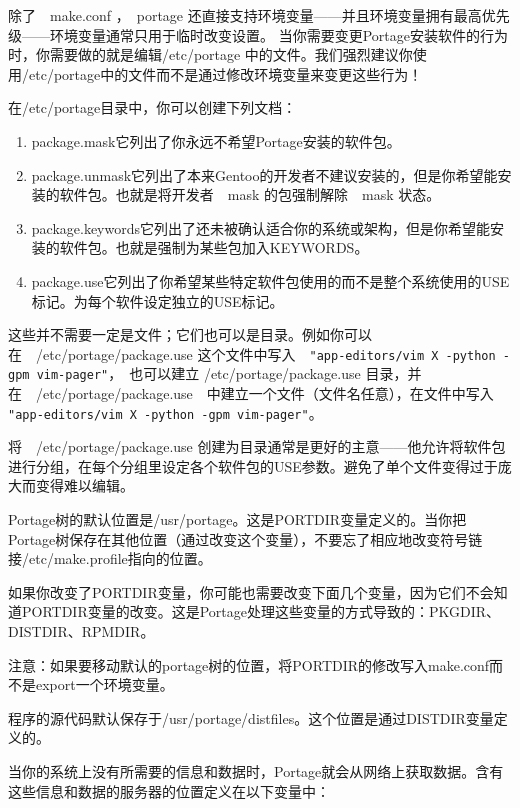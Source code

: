 除了　make.conf ，　portage 还直接支持环境变量——并且环境变量拥有最高优先级——环境变量通常只用于临时改变设置。
当你需要变更Portage安装软件的行为时，你需要做的就是编辑/etc/portage 中的文件。我们强烈建议你使用/etc/portage中的文件而不是通过修改环境变量来变更这些行为！


在/etc/portage目录中，你可以创建下列文档：

\begin{enumerate}
\item package.mask它列出了你永远不希望Portage安装的软件包。
\item package.unmask它列出了本来Gentoo的开发者不建议安装的，但是你希望能安装的软件包。也就是将开发者　mask 的包强制解除　mask 状态。
\item package.keywords它列出了还未被确认适合你的系统或架构，但是你希望能安装的软件包。也就是强制为某些包加入KEYWORDS。
\item package.use它列出了你希望某些特定软件包使用的而不是整个系统使用的USE标记。为每个软件设定独立的USE标记。
\end{enumerate}

这些并不需要一定是文件；它们也可以是目录。例如你可以在　/etc/portage/package.use 这个文件中写入　\texttt{"app-editors/vim X -python -gpm vim-pager"}，　也可以建立
/etc/portage/package.use 目录，并在　/etc/portage/package.use　中建立一个文件（文件名任意），在文件中写入 \texttt{"app-editors/vim X -python -gpm vim-pager"}。

将　/etc/portage/package.use 创建为目录通常是更好的主意——他允许将软件包进行分组，在每个分组里设定各个软件包的USE参数。避免了单个文件变得过于庞大而变得难以编辑。

\vspace{3ex}

Portage树的默认位置是/usr/portage。这是PORTDIR变量定义的。当你把Portage树保存在其他位置（通过改变这个变量），不要忘了相应地改变符号链接/etc/make.profile指向的位置。

如果你改变了PORTDIR变量，你可能也需要改变下面几个变量，因为它们不会知道PORTDIR变量的改变。这是Portage处理这些变量的方式导致的：PKGDIR、DISTDIR、RPMDIR。

\begin{notice}
注意：如果要移动默认的portage树的位置，将PORTDIR的修改写入make.conf而不是export一个环境变量。
\end{notice}

程序的源代码默认保存于/usr/portage/distfiles。这个位置是通过DISTDIR变量定义的。

当你的系统上没有所需要的信息和数据时，Portage就会从网络上获取数据。含有这些信息和数据的服务器的位置定义在以下变量中：

